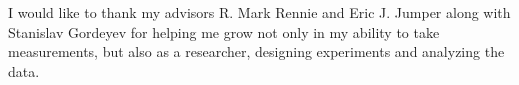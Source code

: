 I would like to thank my advisors R. Mark Rennie and Eric J. Jumper along with Stanislav Gordeyev for helping me grow not only in my ability to take measurements, but also as a researcher, designing experiments and analyzing the data.
